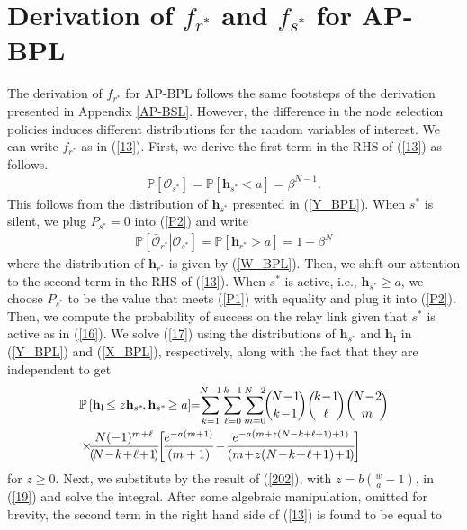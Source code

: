 \documentclass[journal,twocolumn]{IEEEtran}
\begin{document}
\section{Derivation of $f_{r^*}$ and $f_{s^*}$ for AP-BPL} \label{AP-BPL}
The derivation of $f_{r^*}$ for AP-BPL follows the same footsteps of the derivation presented in Appendix \ref{AP-BSL}. However, the difference in the node selection policies induces different distributions for the random variables of interest. We can write $f_{r^*}$ as in (\ref{13}). First, we derive the first term in the RHS of (\ref{13}) as follows.
\begin{align}\label{201}
\mathbb{P}\left[ \mathcal{O}_{s^*}\right]=
\mathbb{P}[\mathbf{h}_{s^*} < a]=\beta^{N-1}.
\end{align}
This follows from the distribution of $\mathbf{h}_{s^*}$ presented in (\ref{Y_BPL}). 
When $s^*$ is silent, we plug $P_{s^*}=0$ into (\ref{P2}) and write
\begin{align}\label{2000}
\mathbb{P}\left[\! \left. \bar{\mathcal{O}}_{r^*}\right| \mathcal{O}_{s^*}\right]=
\mathbb{P}[\mathbf{h}_{r^*}>a]=1-\beta^N
\end{align}
where the distribution of $\mathbf{h}_{r^*}$ is given by (\ref{W_BPL}).
Then, we shift our attention to the second term in the RHS of (\ref{13}).
When $s^*$ is active, i.e., $\mathbf{h}_{s^*} \geq a$, we choose $P_{s^*}$ to be the value that meets (\ref{P1}) with equality and plug it into (\ref{P2}).
Then, we compute the probability of success on the relay link given that $s^*$ is active as in (\ref{16}). 
We solve (\ref{17}) using the distributions of $\mathbf{h}_{s^*}$ and $\mathbf{h}_{\mathrm{I}}$ in (\ref{Y_BPL}) and (\ref{X_BPL}), respectively, along with the fact that they are independent to get
\begin{align}\label{202}
&\mathbb{P}\left[\mathbf{h}_{\mathrm{I}}\! \leq z \mathbf{h}_{s^*}\!,\mathbf{h}_{s^*}\! \geq a\right]\!\! = \!\!
\displaystyle \sum_{k=1}^{N-1} \sum_{\ell=0}^{k-1} \sum_{m=0}^{N-2} 
\!\!{\!N\! - \! 1 \!\choose k\! - \!1} {\!k\! - \! 1\! \choose \!\ell\!} {\!N\! - \! 2\! \choose\! m\!} \notag \\  
& \times \!\!\!
\frac{N(-1)^{m+\ell}}{(\! N \! - \! k \! + \! \ell \! + \! 1 \!)} \!\!
\left[\! 
\frac{e^{-a(m+1)}}{(m+1)}\! - \!
\frac{e^{-a\left(m+z(N-k+\ell+1)+1\right)}}
{\left( m \! + \!z  (  N \! - \! k \! +\! \ell \! + \!1 ) \! + \! 1\! \right)}\!
\right]  
\end{align}
for $z \geq 0$. Next, we substitute by the result of (\ref{202}), with $z=b\left(\frac{w}{a}-1\right)$, in (\ref{19}) and solve the integral. After some algebraic manipulation, omitted for brevity, the second term in the right hand side of (\ref{13}) is found to be equal to
\end{document}
